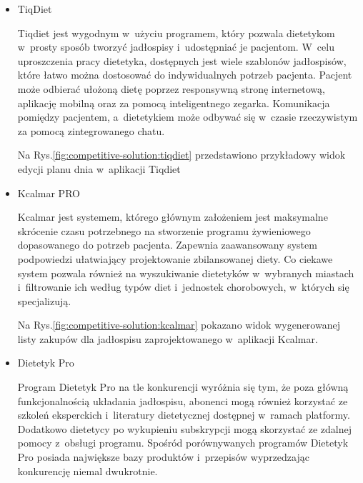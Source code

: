 \begin{itemize}
    \item TiqDiet\cite{url:tiqdiet}

        Tiqdiet jest wygodnym w~użyciu programem, który pozwala dietetykom w~prosty sposób tworzyć jadłospisy i~udostępniać je pacjentom.
        W~celu uproszczenia pracy dietetyka, dostępnych jest wiele szablonów jadłospisów, które łatwo można dostosować do indywidualnych potrzeb pacjenta.
        Pacjent może odbierać ułożoną dietę poprzez responsywną stronę internetową, aplikację mobilną oraz za pomocą inteligentnego zegarka.
        Komunikacja pomiędzy pacjentem, a~dietetykiem może odbywać się w~czasie rzeczywistym za pomocą zintegrowanego chatu.

        Na Rys.\ref{fig:competitive-solution:tiqdiet} przedstawiono przykładowy widok edycji planu dnia w~aplikacji Tiqdiet

    \item Kcalmar PRO\cite{url:kcalmar}

        Kcalmar jest systemem, którego głównym założeniem jest maksymalne skrócenie czasu potrzebnego na stworzenie programu żywieniowego dopasowanego do potrzeb pacjenta.
        Zapewnia zaawansowany system podpowiedzi ułatwiający projektowanie zbilansowanej diety.
        Co ciekawe system pozwala również na wyszukiwanie dietetyków w~wybranych miastach i~filtrowanie ich według typów diet i~jednostek chorobowych, w~których się specjalizują.

        Na Rys.\ref{fig:competitive-solution:kcalmar} pokazano widok wygenerowanej listy zakupów dla jadłospisu zaprojektowanego w~aplikacji Kcalmar.

    \item Dietetyk Pro\cite{url:dietetyk-pro}

        Program Dietetyk Pro na tle konkurencji wyróżnia się tym, że poza główną funkcjonalnością układania jadłospisu, abonenci mogą również korzystać ze szkoleń eksperckich i~literatury dietetycznej dostępnej w~ramach platformy.
        Dodatkowo dietetycy po wykupieniu subskrypcji mogą skorzystać ze zdalnej pomocy z~obsługi programu.
        Spośród porównywanych programów Dietetyk Pro posiada największe bazy produktów i~przepisów wyprzedzając konkurencję niemal dwukrotnie.


\end{itemize}
